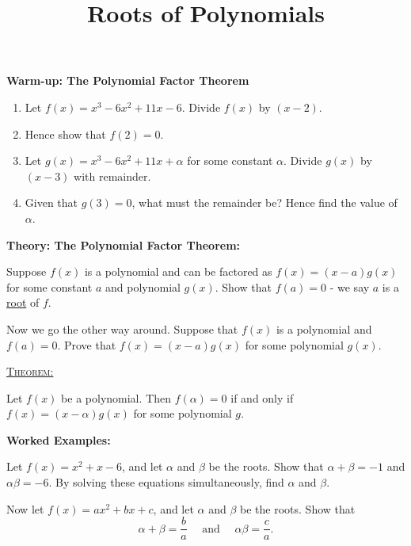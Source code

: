 \documentclass{article}
\begin{document}
\title{Roots of Polynomials}
\date{}

\maketitle
\thispagestyle{empty}

\Large



{\bf Warm-up: The Polynomial Factor Theorem}\bigskip


\begin{enumerate}
	\item Let $f(x)=x^3-6x^2+11x-6$. Divide $f(x)$ by $(x-2)$.
	\item Hence show that $f(2)=0$.
	\item Let $g(x)=x^3-6x^2+11x + \alpha$ for some constant $\alpha$. Divide $g(x)$ by $(x-3)$ with remainder.
	\item Given that $g(3)=0$, what must the remainder be? Hence find the value of $\alpha$.
\end{enumerate}

\clearpage


\textbf{Theory: The Polynomial Factor Theorem:}\bigskip



Suppose $f(x)$ is a polynomial and can be factored as $f(x)=(x-a)g(x)$ for some constant $a$ and polynomial $g(x)$. Show that $f(a)=0$ - we say $a$ is a \underline{root} of $f$.

\vfill

Now we go the other way around. Suppose that $f(x)$ is a polynomial and $f(a)=0$. Prove that $f(x)=(x-a)g(x)$ for some polynomial $g(x)$.

\vfill


\textsc{\underline{Theorem:}}\medskip

Let $f(x)$ be a polynomial. Then $f(\alpha)=0$ if and only if $f(x)=(x-\alpha)g(x)$ for some polynomial $g$.
\clearpage


\textbf{Worked Examples:}\bigskip

Let $f(x)=x^2+x-6$, and let $\alpha$ and $\beta$ be the roots. Show that $\alpha+\beta=-1$ and $\alpha\beta=-6$. By solving these equations simultaneously, find $\alpha$ and $\beta$.

\vfill

\vfill

Now let $f(x)=ax^2+bx+c$, and let $\alpha$ and $\beta$ be the roots. Show that
\[\alpha+\beta = \frac{b}{a}\quad\mbox{ and }\quad \alpha\beta = \frac{c}{a}.\]
\end{document}
